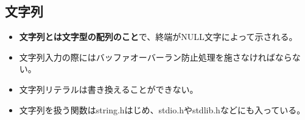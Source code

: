 \begin{shadebox}
\subsection*{文字列}
\begin{itemize}
\item \textbf{文字列とは文字型の配列のこと}で、終端がNULL文字によって示される。
\item 文字列入力の際にはバッファオーバーラン防止処理を施さなければならない。
\item 文字列リテラルは書き換えることができない。
\item 文字列を扱う関数はstring.hはじめ、stdio.hやstdlib.hなどにも入っている。
\end{itemize}
\end{shadebox}
